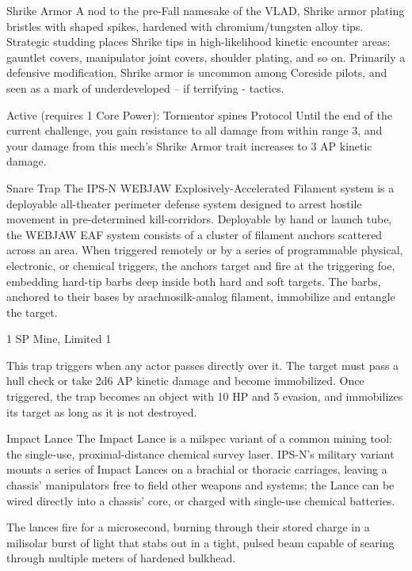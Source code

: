                                                    Shrike Armor
  A nod to the pre-Fall namesake of the VLAD, Shrike armor plating bristles with shaped spikes, hardened
  with chromium/tungsten alloy tips. Strategic studding places Shrike tips in high-likelihood kinetic
  encounter areas: gauntlet covers, manipulator joint covers, shoulder plating, and so on. Primarily a
  defensive modification, Shrike armor is uncommon among Coreside pilots, and seen as a mark of
  underdeveloped -- if terrifying - tactics.

  Active (requires 1 Core Power):
  Tormentor spines
  Protocol
  Until the end of the current challenge, you gain resistance to all damage from within range 3, and your
  damage from this mech’s Shrike Armor trait increases to 3 AP kinetic damage.

Snare Trap
The IPS-N WEBJAW Explosively-Accelerated Filament system is a deployable all-theater perimeter
defense system designed to arrest hostile movement in pre-determined kill-corridors. Deployable by hand
or launch tube, the WEBJAW EAF system consists of a cluster of filament anchors scattered across an
area. When triggered remotely or by a series of programmable physical, electronic, or chemical triggers, the
anchors target and fire at the triggering foe, embedding hard-tip barbs deep inside both hard and soft
targets. The barbs, anchored to their bases by arachnosilk-analog filament, immobilize and entangle the
target.




1 SP
Mine, Limited 1

This trap triggers when any actor passes directly over it. The target must pass a hull check or
take 2d6 AP kinetic damage and become immobilized. Once triggered, the trap becomes an
object with 10 HP and 5 evasion, and immobilizes its target as long as it is not destroyed.


Impact Lance
The Impact Lance is a milspec variant of a common mining tool: the single-use, proximal-distance chemical
survey laser. IPS-N’s military variant mounts a series of Impact Lances on a brachial or thoracic carriages,
leaving a chassis’ manipulators free to field other weapons and systems; the Lance can be wired directly
into a chassis’ core, or charged with single-use chemical batteries.

The lances fire for a microsecond, burning through their stored charge in a milisolar burst of light that stabs
out in a tight, pulsed beam capable of searing through multiple meters of hardened bulkhead.

